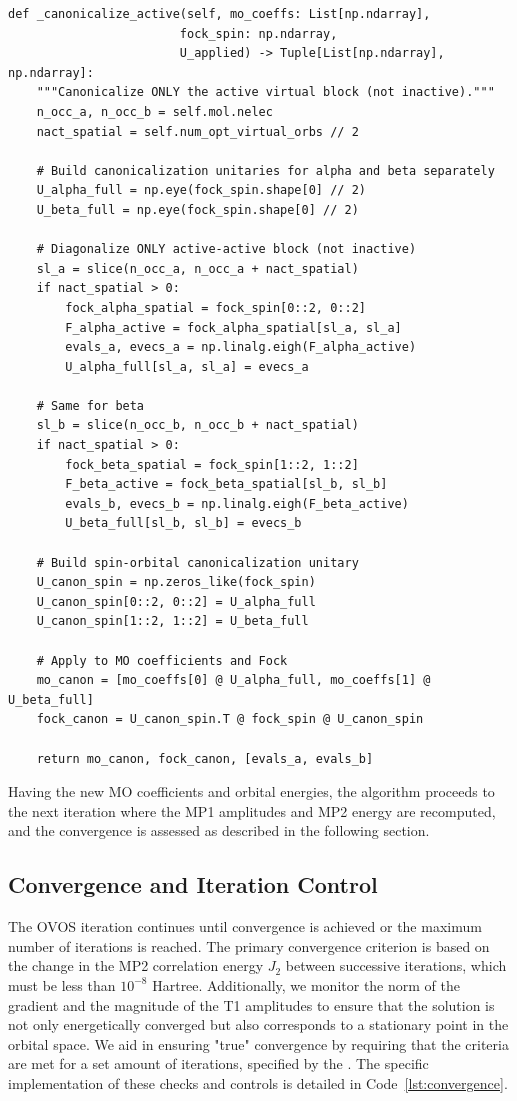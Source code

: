 \begin{lstlisting}[style=python, caption={Re-canonicalization of active virtual block}, label=lst_canonicalize]
def _canonicalize_active(self, mo_coeffs: List[np.ndarray],
                        fock_spin: np.ndarray,
                        U_applied) -> Tuple[List[np.ndarray], np.ndarray]:
    """Canonicalize ONLY the active virtual block (not inactive)."""
    n_occ_a, n_occ_b = self.mol.nelec
    nact_spatial = self.num_opt_virtual_orbs // 2
    
    # Build canonicalization unitaries for alpha and beta separately
    U_alpha_full = np.eye(fock_spin.shape[0] // 2)
    U_beta_full = np.eye(fock_spin.shape[0] // 2)
    
    # Diagonalize ONLY active-active block (not inactive)
    sl_a = slice(n_occ_a, n_occ_a + nact_spatial)
    if nact_spatial > 0:
        fock_alpha_spatial = fock_spin[0::2, 0::2]
        F_alpha_active = fock_alpha_spatial[sl_a, sl_a]
        evals_a, evecs_a = np.linalg.eigh(F_alpha_active)
        U_alpha_full[sl_a, sl_a] = evecs_a
    
    # Same for beta
    sl_b = slice(n_occ_b, n_occ_b + nact_spatial)
    if nact_spatial > 0:
        fock_beta_spatial = fock_spin[1::2, 1::2]
        F_beta_active = fock_beta_spatial[sl_b, sl_b]
        evals_b, evecs_b = np.linalg.eigh(F_beta_active)
        U_beta_full[sl_b, sl_b] = evecs_b
    
    # Build spin-orbital canonicalization unitary
    U_canon_spin = np.zeros_like(fock_spin)
    U_canon_spin[0::2, 0::2] = U_alpha_full
    U_canon_spin[1::2, 1::2] = U_beta_full
    
    # Apply to MO coefficients and Fock
    mo_canon = [mo_coeffs[0] @ U_alpha_full, mo_coeffs[1] @ U_beta_full]
    fock_canon = U_canon_spin.T @ fock_spin @ U_canon_spin
    
    return mo_canon, fock_canon, [evals_a, evals_b]
\end{lstlisting}

Having the new MO coefficients and orbital energies, the algorithm proceeds to the next iteration where the MP1 amplitudes and MP2 energy are recomputed, and the convergence is assessed as described in the following section.

\subsection{Convergence and Iteration Control}

The OVOS iteration continues until convergence is achieved or the maximum number of iterations is reached. The primary convergence criterion is based on the change in the MP2 correlation energy $J_2$ between successive iterations, which must be less than $10^{-8}$ Hartree. Additionally, we monitor the norm of the gradient and the magnitude of the T1 amplitudes to ensure that the solution is not only energetically converged but also corresponds to a stationary point in the orbital space. We aid in ensuring "true" convergence by requiring that the criteria are met for a set amount of iterations, specified by the . The specific implementation of these checks and controls is detailed in Code~\ref{lst:convergence}.

